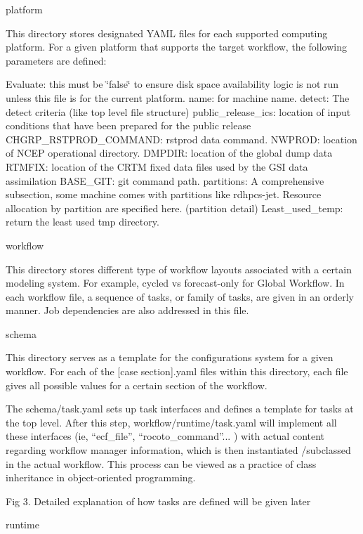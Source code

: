 platform

This directory stores designated Y\-A\-M\-L files for each supported computing platform. For a given platform that supports the target workflow, the following parameters are defined\-:

Evaluate\-: this must be \char`\"{}false\char`\"{} to ensure disk space availability logic is not run unless this file is for the current platform. name\-: for machine name. detect\-: The detect criteria (like top level file structure) public\-\_\-release\-\_\-ics\-: location of input conditions that have been prepared for the public release C\-H\-G\-R\-P\-\_\-\-R\-S\-T\-P\-R\-O\-D\-\_\-\-C\-O\-M\-M\-A\-N\-D\-: rstprod data command. N\-W\-P\-R\-O\-D\-: location of N\-C\-E\-P operational directory. D\-M\-P\-D\-I\-R\-: location of the global dump data R\-T\-M\-F\-I\-X\-: location of the C\-R\-T\-M fixed data files used by the G\-S\-I data assimilation B\-A\-S\-E\-\_\-\-G\-I\-T\-: git command path. partitions\-: A comprehensive subsection, some machine comes with partitions like rdhpcs-\/jet. Resource allocation by partition are specified here. (partition detail) Least\-\_\-used\-\_\-temp\-: return the least used tmp directory.

workflow

This directory stores different type of workflow layouts associated with a certain modeling system. For example, cycled vs forecast-\/only for Global Workflow. In each workflow file, a sequence of tasks, or family of tasks, are given in an orderly manner. Job dependencies are also addressed in this file.

schema

This directory serves as a template for the configurations system for a given workflow. For each of the \mbox{[}case section\mbox{]}.yaml files within this directory, each file gives all possible values for a certain section of the workflow.

The schema/task.\-yaml sets up task interfaces and defines a template for tasks at the top level. After this step, workflow/runtime/task.\-yaml will implement all these interfaces (ie, “ecf\-\_\-file”, “rocoto\-\_\-command”... ) with actual content regarding workflow manager information, which is then instantiated /subclassed in the actual workflow. This process can be viewed as a practice of class inheritance in object-\/oriented programming.

Fig 3. Detailed explanation of how tasks are defined will be given later

runtime

